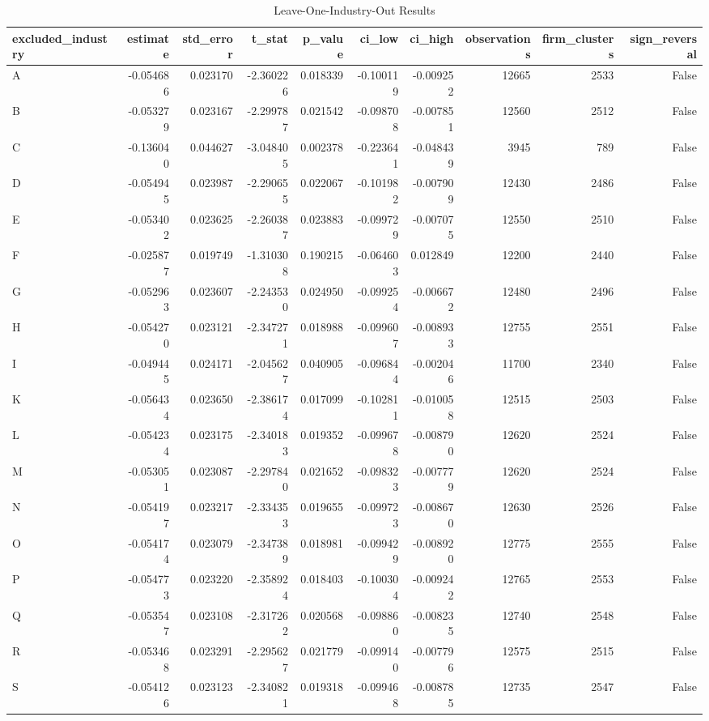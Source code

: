\begin{table}
\caption{Leave-One-Industry-Out Results}
\label{tab:table3_leave_one_industry_out}
\begin{tabular}{lrrrrrrrrr}
\toprule
excluded_industry & estimate & std_error & t_stat & p_value & ci_low & ci_high & observations & firm_clusters & sign_reversal \\
\midrule
A & -0.054686 & 0.023170 & -2.360226 & 0.018339 & -0.100119 & -0.009252 & 12665 & 2533 & False \\
B & -0.053279 & 0.023167 & -2.299787 & 0.021542 & -0.098708 & -0.007851 & 12560 & 2512 & False \\
C & -0.136040 & 0.044627 & -3.048405 & 0.002378 & -0.223641 & -0.048439 & 3945 & 789 & False \\
D & -0.054945 & 0.023987 & -2.290655 & 0.022067 & -0.101982 & -0.007909 & 12430 & 2486 & False \\
E & -0.053402 & 0.023625 & -2.260387 & 0.023883 & -0.099729 & -0.007075 & 12550 & 2510 & False \\
F & -0.025877 & 0.019749 & -1.310308 & 0.190215 & -0.064603 & 0.012849 & 12200 & 2440 & False \\
G & -0.052963 & 0.023607 & -2.243530 & 0.024950 & -0.099254 & -0.006672 & 12480 & 2496 & False \\
H & -0.054270 & 0.023121 & -2.347271 & 0.018988 & -0.099607 & -0.008933 & 12755 & 2551 & False \\
I & -0.049445 & 0.024171 & -2.045627 & 0.040905 & -0.096844 & -0.002046 & 11700 & 2340 & False \\
K & -0.056434 & 0.023650 & -2.386174 & 0.017099 & -0.102811 & -0.010058 & 12515 & 2503 & False \\
L & -0.054234 & 0.023175 & -2.340183 & 0.019352 & -0.099678 & -0.008790 & 12620 & 2524 & False \\
M & -0.053051 & 0.023087 & -2.297840 & 0.021652 & -0.098323 & -0.007779 & 12620 & 2524 & False \\
N & -0.054197 & 0.023217 & -2.334353 & 0.019655 & -0.099723 & -0.008670 & 12630 & 2526 & False \\
O & -0.054174 & 0.023079 & -2.347389 & 0.018981 & -0.099429 & -0.008920 & 12775 & 2555 & False \\
P & -0.054773 & 0.023220 & -2.358924 & 0.018403 & -0.100304 & -0.009242 & 12765 & 2553 & False \\
Q & -0.053547 & 0.023108 & -2.317262 & 0.020568 & -0.098860 & -0.008235 & 12740 & 2548 & False \\
R & -0.053468 & 0.023291 & -2.295627 & 0.021779 & -0.099140 & -0.007796 & 12575 & 2515 & False \\
S & -0.054126 & 0.023123 & -2.340821 & 0.019318 & -0.099468 & -0.008785 & 12735 & 2547 & False \\
\bottomrule
\end{tabular}
\end{table}
